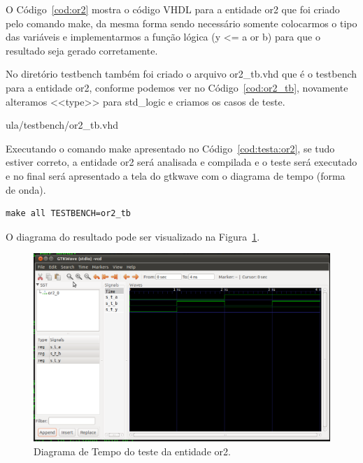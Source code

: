 \documentclass[a4paper,11pt]{report}
\begin{document}
O Código~\ref{cod:or2} mostra o código VHDL para a entidade or2 que foi criado pelo comando make, da mesma forma sendo necessário somente colocarmos o tipo das variáveis e implementarmos a função lógica (y <= a or b) para que o resultado seja gerado corretamente.

\lstset{language=VHDL}
\lstset{numbers=left, numberstyle=\tiny, stepnumber=1, numbersep=3pt}


No diretório testbench também foi criado o arquivo or2\_tb.vhd que é o testbench para a entidade or2, conforme podemos ver no Código~\ref{cod:or2_tb}, novamente alteramos <<type>> para std\_logic e criamos os casos de teste.

\lstset{language=VHDL}
\lstset{numbers=left, numberstyle=\tiny, stepnumber=1, numbersep=3pt}
 {ula/testbench/or2_tb.vhd}

Executando o comando make apresentado no Código~\ref{cod:testa:or2}, se tudo estiver correto, a entidade or2 será analisada e compilada e o teste será executado e no final será apresentado a tela do gtkwave com o diagrama de tempo (forma de onda).

\lstset{numbers=left, numberstyle=\tiny, stepnumber=1, numbersep=3pt}
\begin{lstlisting}[label=cod:testa:or2,caption=Comando para executar o testbench da entidade or2.]
  make all TESTBENCH=or2_tb
\end{lstlisting}

O diagrama do resultado pode ser visualizado na Figura~\ref{fig:gtw:or2}.

\begin{figure}[H]
\centering
\includegraphics[width=1\textwidth]{figuras/gtw_or2.png}
\caption{Diagrama de Tempo do teste da entidade or2.}
\label{fig:gtw:or2}
\end{figure}
\end{document}

